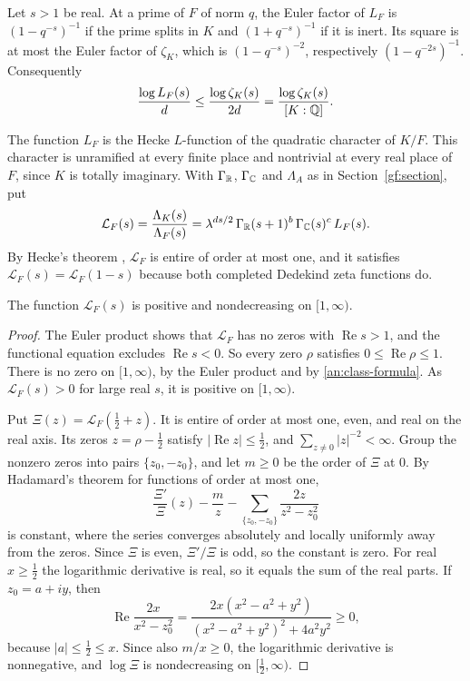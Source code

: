 Let $s>1$ be real. At a prime of $F$ of norm $q$, the Euler factor of $L_F$
is $(1-q^{-s})^{-1}$ if the prime splits in $K$ and $(1+q^{-s})^{-1}$ if it
is inert. Its square is at most the Euler factor of $\zeta_K$, which is
$(1-q^{-s})^{-2}$, respectively $(1-q^{-2s})^{-1}$. Consequently
\begin{equation}\label{an:relative-euler}
 \frac{\log L_F(s)}d\le\frac{\log\zeta_K(s)}{2d}
 =\frac{\log\zeta_K(s)}{[K:\mathbb Q]}.
\end{equation}

The function $L_F$ is the Hecke $L$-function of the quadratic character of
$K/F$. This character is unramified at every finite place and nontrivial at
every real place of $F$, since $K$ is totally imaginary. With $\Gamma_\mathbb R$,
$\Gamma_\mathbb C$ and $\Lambda_A$ as in Section~\ref{gf:section}, put
\begin{equation}\label{an:completion}
 \mathcal L_F(s)=\frac{\Lambda_K(s)}{\Lambda_F(s)}
 =\lambda^{ds/2}\,\Gamma_\mathbb R(s+1)^b\,\Gamma_\mathbb C(s)^c\,L_F(s).
\end{equation}
By Hecke's theorem \cite{Hecke1920,Tate1967}, $\mathcal L_F$ is entire of
order at most one, and it satisfies $\mathcal L_F(s)=\mathcal L_F(1-s)$
because both completed Dedekind zeta functions do.

\begin{lemma}\label{an:monotonicity}
The function $\mathcal L_F(s)$ is positive and nondecreasing on $[1,\infty)$.
\end{lemma}

\begin{proof}
The Euler product shows that $\mathcal L_F$ has no zeros with
$\operatorname{Re}s>1$, and the functional equation excludes
$\operatorname{Re}s<0$. So every zero $\rho$ satisfies $0\le\operatorname{Re}
\rho\le1$. There is no zero on $[1,\infty)$, by the Euler product and by
\eqref{an:class-formula}. As $\mathcal L_F(s)>0$ for large real $s$,
it is positive on $[1,\infty)$.

Put $\Xi(z)=\mathcal L_F(\frac12+z)$. It is entire of order at most one,
even, and real on the real axis. Its zeros $z=\rho-\frac12$ satisfy
$|\operatorname{Re}z|\le\frac12$, and $\sum_{z\ne0}|z|^{-2}<\infty$. Group
the nonzero zeros into pairs $\{z_0,-z_0\}$, and let $m\ge0$ be the order of
$\Xi$ at $0$. By Hadamard's theorem for functions of order at most one,
\[
 \frac{\Xi'}{\Xi}(z)-\frac mz-\sum_{\{z_0,-z_0\}}\frac{2z}{z^2-z_0^2}
\]
is constant, where the series converges absolutely and locally uniformly
away from the zeros. Since $\Xi$ is even, $\Xi'/\Xi$ is odd, so the constant
is zero. For real $x\ge\frac12$ the logarithmic derivative is real, so it
equals the sum of the real parts. If $z_0=a+iy$, then
\[
 \operatorname{Re}\frac{2x}{x^2-z_0^2}
 =\frac{2x(x^2-a^2+y^2)}{(x^2-a^2+y^2)^2+4a^2y^2}\ge0,
\]
because $|a|\le\frac12\le x$. Since also $m/x\ge0$, the logarithmic
derivative is nonnegative, and $\log\Xi$ is nondecreasing on
$[\frac12,\infty)$.
\end{proof}

